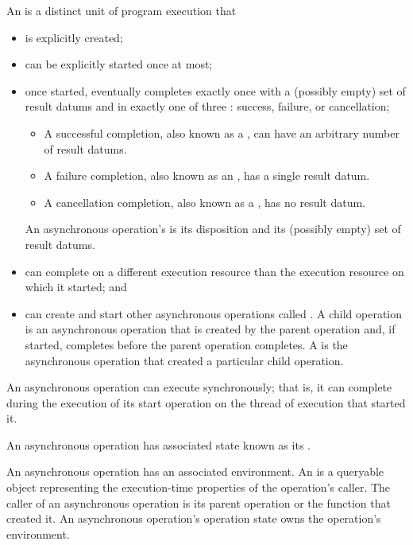 \pnum
An  is
a distinct unit of program execution that
\begin{itemize}
\item
is explicitly created;
\item
can be explicitly started once at most;
\item
once started, eventually completes exactly once
with a (possibly empty) set of result datums and
in exactly one of three :
success, failure, or cancellation;
\begin{itemize}
\item
A successful completion, also known as a ,
can have an arbitrary number of result datums.
\item
A failure completion, also known as an ,
has a single result datum.
\item
A cancellation completion, also known as a ,
has no result datum.
\end{itemize}
An asynchronous operation's 
is its disposition and its (possibly empty) set of result datums.
\item
can complete on a different execution resource
than the execution resource on which it started; and
\item
can create and start other asynchronous operations
called .
A child operation is an asynchronous operation
that is created by the parent operation and,
if started, completes before the parent operation completes.
A  is the asynchronous operation
that created a particular child operation.
\end{itemize}
\begin{note}
An asynchronous operation can execute synchronously;
that is, it can complete during the execution of its start operation
on the thread of execution that started it.
\end{note}

\pnum
An asynchronous operation has associated state
known as its .

\pnum
An asynchronous operation has an associated environment.
An  is a queryable object
representing the execution-time properties of the operation's caller.
The caller of an asynchronous operation is
its parent operation or the function that created it.
An asynchronous operation's operation state owns the operation's environment.

